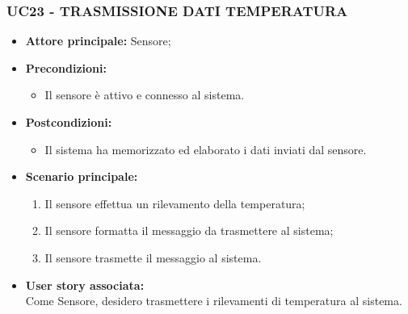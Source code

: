 \subsubsection{UC23 - TRASMISSIONE DATI TEMPERATURA}
\begin{itemize}
    \item \textbf{Attore principale:} Sensore;
    \item \textbf{Precondizioni:}
        \begin{itemize}
            \item Il sensore è attivo e connesso al sistema. 
        \end{itemize}
    \item \textbf{Postcondizioni:}
        \begin{itemize}
            \item Il sistema ha memorizzato ed elaborato i dati inviati dal sensore.
        \end{itemize}
    \item \textbf{Scenario principale:}
        \begin{enumerate}
            \item Il sensore effettua un rilevamento della temperatura;
            \item Il sensore formatta il messaggio da trasmettere al sistema;
            \item Il sensore trasmette il messaggio al sistema.
        \end{enumerate}
    \item \textbf{User story associata:} \\
    Come Sensore, desidero trasmettere i rilevamenti di temperatura al sistema.
\end{itemize}

